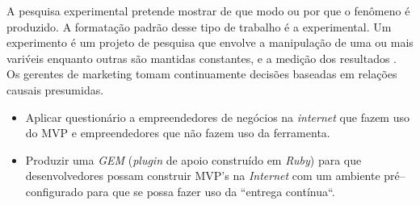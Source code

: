 A pesquisa experimental pretende mostrar de que modo ou por que o fen\^omeno \'e produzido. A formata\c{c}\~ao padr\~ao desse tipo de trabalho \'e a experimental. Um experimento \'e um projeto de pesquisa que envolve a manipula\c{c}\~ao de uma ou mais vari\'veis enquanto outras s\~ao mantidas constantes, e a medi\c{c}\~ao dos resultados \cite{churchill2009marketing} \cite{malhotra2006pesquisa}. Os gerentes de marketing tomam continuamente decis\~oes baseadas em rela\c{c}\~oes causais presumidas.



\begin{itemize}
\item Aplicar question\'ario a empreendedores de neg\'ocios na \emph{internet} que fazem uso do MVP e empreendedores que n\~ao fazem uso da ferramenta.

\item Produzir uma \emph{GEM} (\emph{plugin} de apoio constru\'ido em \emph{Ruby}) para que desenvolvedores possam construir MVP's na \emph{Internet} com um ambiente pr\'e--configurado para que se possa fazer uso da ``entrega cont\'inua``.
\end{itemize}

